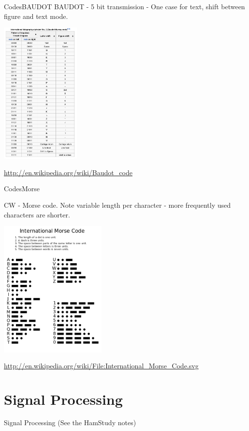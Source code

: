 \documentclass{beamer}
\begin{document}
\begin{frame}{Codes}{BAUDOT}
BAUDOT - 5 bit transmission - One case for text, shift between figure and text mode.
\begin{centering}
\includegraphics[width=0.3\textwidth]{images/baudot_ita.png}

\tiny{\url{http://en.wikipedia.org/wiki/Baudot_code}}
\end{centering}
\end{frame}

\begin{frame}{Codes}{Morse}

CW - Morse code.  Note variable length per character - more frequently used characters are shorter.
\begin{centering}
\includegraphics[width=0.4\textwidth]{images/morse.png}

\small{\url{http://en.wikipedia.org/wiki/File:International_Morse_Code.svg}}
\end{centering}
\end{frame}


\section{Signal Processing}
\begin{frame}{Signal Processing}
(See the HamStudy notes)
\end{frame}





\end{document}
